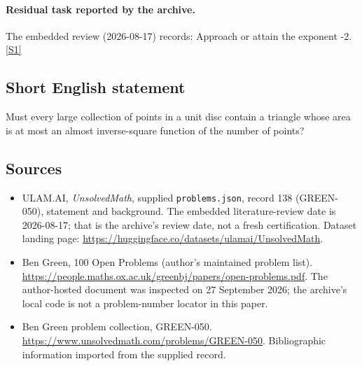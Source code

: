 \documentclass[11pt,a4paper]{article}
\newcommand{\sref}[2]{\hyperlink{source:#1:#2}{[S#2]}}
\begin{document}
\paragraph{Residual task reported by the archive.}

The embedded review (2026-08-17) records: Approach or attain the exponent -2. \sref{138}{1}

\subsection{Short English statement}

Must every large collection of points in a unit disc contain a triangle whose area is at most an almost inverse-square function of the number of points?

\subsection{Sources}

{\small

\begin{itemize}

\item[\hypertarget{source:138:1}{S1}] ULAM.AI, \emph{UnsolvedMath}, supplied \texttt{problems.json}, record 138 (GREEN-050), statement and background. The embedded literature-review date is 2026-08-17; that is the archive’s review date, not a fresh certification. Dataset landing page: \url{https://huggingface.co/datasets/ulamai/UnsolvedMath}.

\item[\hypertarget{source:138:2}{S2}] Ben Green, 100 Open Problems (author’s maintained problem list). \url{https://people.maths.ox.ac.uk/greenbj/papers/open-problems.pdf}. The author-hosted document was inspected on 27 September 2026; the archive’s local code is not a problem-number locator in this paper.

\item[\hypertarget{source:138:3}{S3}] Ben Green problem collection, GREEN-050. \url{https://www.unsolvedmath.com/problems/GREEN-050}. Bibliographic information imported from the supplied record.

\end{itemize}

}

\label{end:138}
\end{document}
